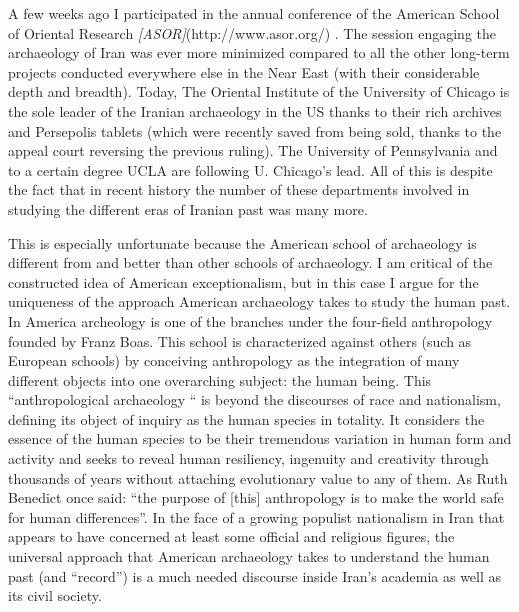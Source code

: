 A few weeks ago I participated in the annual conference of the American
School of Oriental Research \emph{{[}ASOR{]}}(http://www.asor.org/) .
The session engaging the archaeology of Iran was ever more minimized
compared to all the other long-term projects conducted everywhere else
in the Near East (with their considerable depth and breadth). Today, The
Oriental Institute of the University of Chicago is the sole leader of
the Iranian archaeology in the US thanks to their rich archives and
Persepolis tablets (which were recently saved from being sold, thanks to
the appeal court reversing the previous ruling). The University of
Pennsylvania and to a certain degree UCLA are following U. Chicago's
lead. All of this is despite the fact that in recent history the number
of these departments involved in studying the different eras of Iranian
past was many more.

This is especially unfortunate because the American school of
archaeology is different from and better than other schools of
archaeology. I am critical of the constructed idea of American
exceptionalism, but in this case I argue for the uniqueness of the
approach American archaeology takes to study the human past. In America
archeology is one of the branches under the four-field anthropology
founded by Franz Boas. This school is characterized against others (such
as European schools) by conceiving anthropology as the integration of
many different objects into one overarching subject: the human being.
This ``anthropological archaeology `` is beyond the discourses of race
and nationalism, defining its object of inquiry as the human species in
totality. It considers the essence of the human species to be their
tremendous variation in human form and activity and seeks to reveal
human resiliency, ingenuity and creativity through thousands of years
without attaching evolutionary value to any of them. As Ruth Benedict
once said: ``the purpose of {[}this{]} anthropology is to make the world
safe for human differences''. In the face of a growing populist
nationalism in Iran that appears to have concerned at least some
official and religious figures, the universal approach that American
archaeology takes to understand the human past (and ``record'') is a
much needed discourse inside Iran's academia as well as its civil
society.
